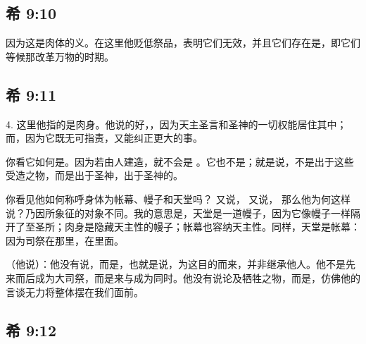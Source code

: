 \subsection{希 9:10}

因为这是肉体的义。在这里他贬低祭品，表明它们无效，并且它们存在是，即它们等候那改革万物的时期。\par


\subsection{希 9:11}

4. 这里他指的是肉身。他说的好，，因为天主圣言和圣神的一切权能居住其中；  而，因为它既无可指责，又能纠正更大的事。\par

你看它如何是。因为若由人建造，就不会是 。它也不是；就是说，不是出于这些受造之物，而是出于圣神，出于圣神的。\par

你看见他如何称呼身体为帐幕、幔子和天堂吗？  又说，  又说，  那么他为何这样说？乃因所象征的对象不同。我的意思是，天堂是一道幔子，因为它像幔子一样隔开了至圣所；肉身是隐藏天主性的幔子；帐幕也容纳天主性。同样，天堂是帐幕：因为司祭在那里，在里面。\par

（他说）：他没有说，而是，也就是说，为这目的而来，并非继承他人。他不是先来而后成为大司祭，而是来与成为同时。他没有说论及牺牲之物，而是，仿佛他的言谈无力将整体摆在我们面前。\par


\subsection{希 9:12}

